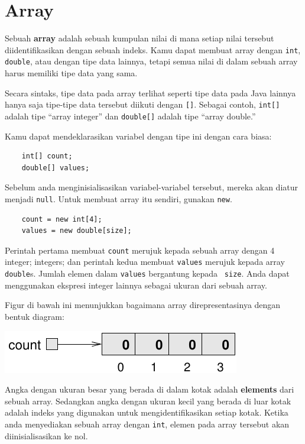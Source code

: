 \chapter{Array}

Sebuah {\bf array}
adalah sebuah kumpulan nilai di mana setiap nilai tersebut diidentifikasikan dengan sebuah indeks.
Kamu dapat membuat array dengan
{\tt int}, {\tt double}, atau dengan tipe data lainnya, 
tetapi semua nilai di dalam sebuah array harus memiliki tipe data yang sama.

Secara sintaks, tipe data pada array terlihat seperti tipe data pada Java lainnya hanya saja tipe-tipe data tersebut 
diikuti dengan {\tt []}.  Sebagai contoh, {\tt int[]} adalah tipe ``array
integer'' dan {\tt double[]} adalah tipe ``array double.''

Kamu dapat mendeklarasikan variabel dengan tipe ini dengan cara biasa:

\begin{lstlisting}
    int[] count;
    double[] values;
\end{lstlisting}
%
Sebelum anda menginisialisasikan variabel-variabel tersebut, mereka akan diatur menjadi {\tt null}.
Untuk membuat array itu sendiri, gunakan {\tt new}.

\begin{lstlisting}
    count = new int[4];
    values = new double[size];
\end{lstlisting}
%
Perintah pertama membuat {\tt count} merujuk kepada sebuah array dengan 4 integer;
integers; dan perintah kedua membuat {\tt values} merujuk kepada array {\tt
double}s.  Jumlah elemen dalam {\tt values} bergantung kepada {\tt
size}.  Anda dapat menggunakan ekspresi integer lainnya sebagai ukuran dari sebuah array.


Figur di bawah ini menunjukkan bagaimana array direpresentasinya dengan bentuk diagram:


\includegraphics{array.pdf}


Angka dengan ukuran besar yang berada di dalam kotak adalah {\bf elements} dari sebuah array.  Sedangkan angka dengan ukuran kecil yang berada di luar kotak adalah indeks yang digunakan untuk mengidentifikasikan setiap kotak.  Ketika anda menyediakan sebuah array dengan
 {\tt int}, elemen pada array tersebut akan diinisialisasikan ke nol.


